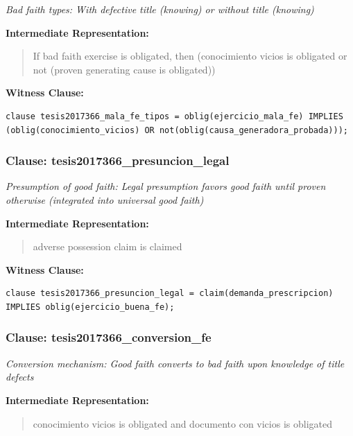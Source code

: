 \documentclass[11pt,a4paper]{article}
\begin{document}
\textit{Bad faith types: With defective title (knowing) or without title (knowing)}

\textbf{Intermediate Representation:}

\begin{quote}
If bad faith exercise is obligated, then (conocimiento vicios is obligated or not (proven generating cause is obligated))
\end{quote}

\textbf{Witness Clause:}

\begin{lstlisting}[style=witnessstyle, language=Witness]
clause tesis2017366_mala_fe_tipos = oblig(ejercicio_mala_fe) IMPLIES (oblig(conocimiento_vicios) OR not(oblig(causa_generadora_probada)));
\end{lstlisting}

\subsubsection{Clause: tesis2017366\_presuncion\_legal}

\textit{Presumption of good faith: Legal presumption favors good faith until proven otherwise (integrated into universal good faith)}

\textbf{Intermediate Representation:}

\begin{quote}
adverse possession claim is claimed
\end{quote}

\textbf{Witness Clause:}

\begin{lstlisting}[style=witnessstyle, language=Witness]
clause tesis2017366_presuncion_legal = claim(demanda_prescripcion) IMPLIES oblig(ejercicio_buena_fe);
\end{lstlisting}

\subsubsection{Clause: tesis2017366\_conversion\_fe}

\textit{Conversion mechanism: Good faith converts to bad faith upon knowledge of title defects}

\textbf{Intermediate Representation:}

\begin{quote}
conocimiento vicios is obligated and documento con vicios is obligated
\end{quote}
\end{document}
